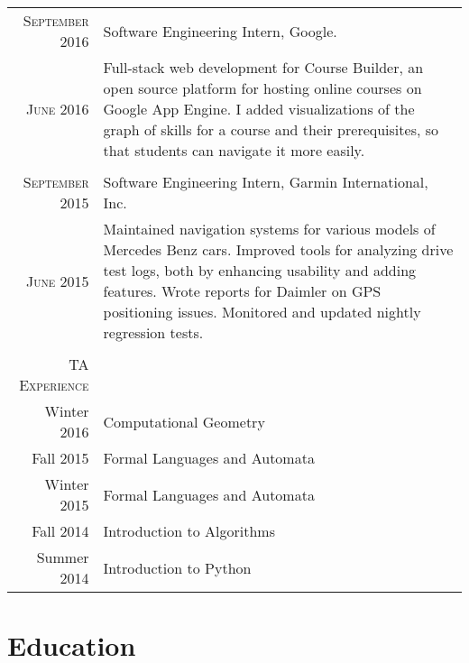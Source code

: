 \documentclass[a4paper,10pt]{article} %
\begin{document}
\begin{tabular}{r|p{11cm}}

\textsc{September 2016} & Software Engineering Intern, Google. \\
\textsc{June 2016} & Full-stack web development for Course Builder, an open source platform for hosting online courses on Google App Engine. I added visualizations of the graph of skills for a course and their prerequisites, so that students can navigate it more easily. \\

& \\

\textsc{September 2015} & Software Engineering Intern, Garmin International, Inc. \\
\textsc{June 2015} & Maintained navigation systems for various models of Mercedes Benz cars. Improved tools for analyzing drive test logs, both by enhancing usability and adding features. Wrote reports for Daimler on GPS positioning issues. Monitored and updated nightly regression tests.\\
\multicolumn{2}{c}{} \\


\textsc{TA Experience} & \\
Winter 2016 & Computational Geometry \\
Fall 2015 & Formal Languages and Automata \\
Winter 2015 & Formal Languages and Automata \\
Fall 2014 & Introduction to Algorithms \\
Summer 2014 & Introduction to Python \\

\end{tabular}


\section{Education}
\end{document}

